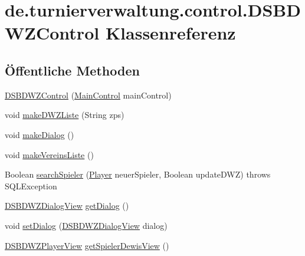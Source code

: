 \hypertarget{classde_1_1turnierverwaltung_1_1control_1_1_d_s_b_d_w_z_control}{}\section{de.\+turnierverwaltung.\+control.\+D\+S\+B\+D\+W\+Z\+Control Klassenreferenz}
\label{classde_1_1turnierverwaltung_1_1control_1_1_d_s_b_d_w_z_control}
\subsection*{Öffentliche Methoden}
\begin{DoxyCompactItemize}
\item 
\hyperlink{classde_1_1turnierverwaltung_1_1control_1_1_d_s_b_d_w_z_control_a3917f2c3da569ee250c43a7efb51cb9d}{D\+S\+B\+D\+W\+Z\+Control} (\hyperlink{classde_1_1turnierverwaltung_1_1control_1_1_main_control}{Main\+Control} main\+Control)
\item 
void \hyperlink{classde_1_1turnierverwaltung_1_1control_1_1_d_s_b_d_w_z_control_a49eecf34784ab652933fe053f32d5f44}{make\+D\+W\+Z\+Liste} (String zps)
\item 
void \hyperlink{classde_1_1turnierverwaltung_1_1control_1_1_d_s_b_d_w_z_control_a3523c34c6ba4b07aa66409538d3d0ef0}{make\+Dialog} ()
\item 
void \hyperlink{classde_1_1turnierverwaltung_1_1control_1_1_d_s_b_d_w_z_control_a9e9e5a297c81faa85d64d094b75cb38f}{make\+Vereins\+Liste} ()
\item 
Boolean \hyperlink{classde_1_1turnierverwaltung_1_1control_1_1_d_s_b_d_w_z_control_a419f79df9aa6f69f38e636867fef064f}{search\+Spieler} (\hyperlink{classde_1_1turnierverwaltung_1_1model_1_1_player}{Player} neuer\+Spieler, Boolean update\+D\+WZ)  throws S\+Q\+L\+Exception 
\item 
\hyperlink{classde_1_1turnierverwaltung_1_1view_1_1_d_s_b_d_w_z_dialog_view}{D\+S\+B\+D\+W\+Z\+Dialog\+View} \hyperlink{classde_1_1turnierverwaltung_1_1control_1_1_d_s_b_d_w_z_control_a7ee4285bf06461ad6629d33804b6dbb2}{get\+Dialog} ()
\item 
void \hyperlink{classde_1_1turnierverwaltung_1_1control_1_1_d_s_b_d_w_z_control_aec82c786138dfe6b7d5353f4b846854a}{set\+Dialog} (\hyperlink{classde_1_1turnierverwaltung_1_1view_1_1_d_s_b_d_w_z_dialog_view}{D\+S\+B\+D\+W\+Z\+Dialog\+View} dialog)
\item 
\hyperlink{classde_1_1turnierverwaltung_1_1view_1_1_d_s_b_d_w_z_player_view}{D\+S\+B\+D\+W\+Z\+Player\+View} \hyperlink{classde_1_1turnierverwaltung_1_1control_1_1_d_s_b_d_w_z_control_a7615b593d348eaaaf0c366d79dacdac5}{get\+Spieler\+Dewis\+View} ()

\end{DoxyCompactItemize}
